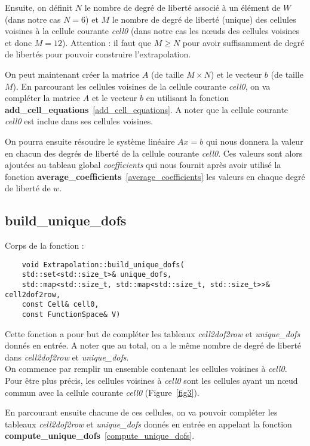 Ensuite, on définit $N$ le nombre de degré de liberté associé à un élément de $W$ (dans notre cas $N=6$) et $M$ le nombre de degré de liberté (unique) des cellules voisines à la cellule courante \textit{cell0} (dans notre cas les nœuds des cellules voisines et donc $M=12$). Attention : il faut que $M\ge N$ pour avoir suffisamment de degré de libertés pour pouvoir construire l'extrapolation.

On peut maintenant créer la matrice $A$ (de taille $M\times N$) et le vecteur $b$ (de taille $M$). En parcourant les cellules voisines de la cellule courante \textit{cell0}, on va compléter la matrice $A$ et le vecteur $b$ en utilisant la fonction \textbf{add\_cell\_equations}~\ref{add_cell_equations}. A noter que la cellule courante \textit{cell0} est inclue dans ses cellules voisines.

On pourra ensuite résoudre le système linéaire $Ax=b$ qui nous donnera la valeur en chacun des degrés de liberté de la cellule courante \textit{cell0}. Ces valeurs sont alors ajoutées au tableau global \textit{coefficients} qui nous fournit après avoir utilisé la fonction \textbf{average\_coefficients}~\ref{average_coefficients} les valeurs en chaque degré de liberté de $w$.

\subsection{build\_unique\_dofs}
\label{build_unique_dofs}

Corps de la fonction :

\begin{lstlisting}
	void Extrapolation::build_unique_dofs(
	std::set<std::size_t>& unique_dofs,
	std::map<std::size_t, std::map<std::size_t, std::size_t>>& cell2dof2row,
	const Cell& cell0,
	const FunctionSpace& V)
\end{lstlisting}

Cette fonction a pour but de compléter les tableaux \textit{cell2dof2row} et \textit{unique\_dofs} donnés en entrée. A noter que au total, on a le même nombre de degré de liberté dans \textit{cell2dof2row} et \textit{unique\_dofs}.\\

On commence par remplir un ensemble contenant les cellules voisines à \textit{cell0}. Pour être plus précis, les cellules voisines à \textit{cell0} sont les cellules ayant un nœud commun avec la cellule courante \textit{cell0} (Figure~\ref{fig3}).

En parcourant ensuite chacune de ces cellules, on va pouvoir compléter les tableaux \textit{cell2dof2row} et \textit{unique\_dofs} donnés en entrée en appelant la fonction \textbf{compute\_unique\_dofs}~\ref{compute_unique_dofs}. 

